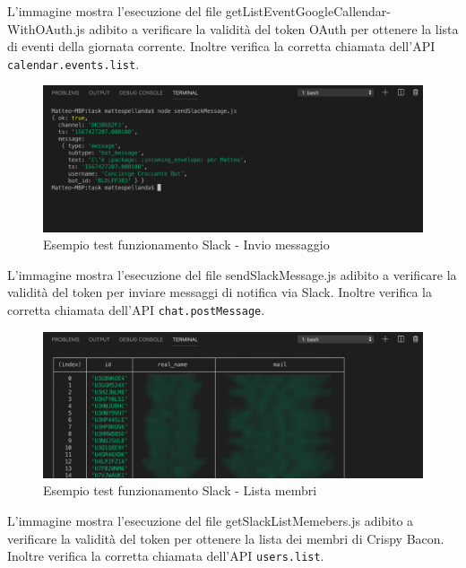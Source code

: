\newpage
\noindent L'immagine mostra l'esecuzione del file getListEventGoogleCallendar-WithOAuth.js adibito a verificare la validità del token OAuth per ottenere la lista di eventi della giornata corrente. Inoltre verifica la corretta chiamata dell'API \texttt{calendar.events.list}.
\begin{figure}[H]
	\includegraphics[width=13cm]{immagini/test-sendSlack.png}
	\caption{\label{fig:test_slack_send}Esempio test funzionamento Slack - Invio messaggio}
\end{figure}
\noindent L'immagine mostra l'esecuzione del file sendSlackMessage.js adibito a verificare la validità del token per inviare messaggi di notifica via Slack. Inoltre verifica la corretta chiamata dell'API \texttt{chat.postMessage}.
\begin{figure}[H]
	\includegraphics[width=13cm]{immagini/test-listSlack.png}
	\caption{\label{fig:test_slack_list}Esempio test funzionamento Slack - Lista membri}
\end{figure}
\noindent L'immagine mostra l'esecuzione del file getSlackListMemebers.js adibito a verificare la validità del token per ottenere la lista dei membri di Crispy Bacon. Inoltre verifica la corretta chiamata dell'API \texttt{users.list}.
